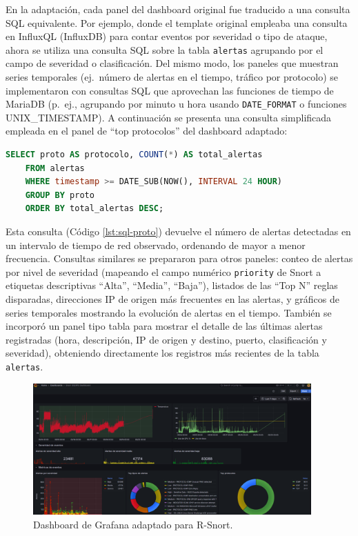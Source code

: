 \documentclass[11pt,a4paper,twoside]{report}
\begin{document}
En la adaptación, cada panel del dashboard original fue traducido a una consulta SQL equivalente. Por ejemplo, donde el template original empleaba una consulta en InfluxQL (InfluxDB) para contar eventos por severidad o tipo de ataque, ahora se utiliza una consulta SQL sobre la tabla \texttt{alertas} agrupando por el campo de severidad o clasificación. Del mismo modo, los paneles que muestran series temporales (ej.~número de alertas en el tiempo, tráfico por protocolo) se implementaron con consultas SQL que aprovechan las funciones de tiempo de MariaDB (p.~ej., agrupando por minuto u hora usando \texttt{DATE\_FORMAT} o funciones UNIX\_TIMESTAMP). A continuación se presenta una consulta simplificada empleada en el panel de “top protocolos” del dashboard adaptado:

\begin{lstlisting}[language=SQL, caption={Consulta SQL (simplificada) para panel de protocolos en Grafana}, label={lst:sql-proto}]
	SELECT proto AS protocolo, COUNT(*) AS total_alertas
	FROM alertas
	WHERE timestamp >= DATE_SUB(NOW(), INTERVAL 24 HOUR)
	GROUP BY proto
	ORDER BY total_alertas DESC;
\end{lstlisting}

Esta consulta (Código \ref{lst:sql-proto}) devuelve el número de alertas detectadas en un intervalo de tiempo de red observado, ordenando de mayor a menor frecuencia. Consultas similares se prepararon para otros paneles: conteo de alertas por nivel de severidad (mapeando el campo numérico \texttt{priority} de Snort a etiquetas descriptivas “Alta”, “Media”, “Baja”), listados de las “Top N” reglas disparadas, direcciones IP de origen más frecuentes en las alertas, y gráficos de series temporales mostrando la evolución de alertas en el tiempo. También se incorporó un panel tipo tabla para mostrar el detalle de las últimas alertas registradas (hora, descripción, IP de origen y destino, puerto, clasificación y severidad), obteniendo directamente los registros más recientes de la tabla \texttt{alertas}.

\begin{figure}[htb]
	\centering
	\includegraphics[width=0.95\textwidth]{documento/grafana1.png}
	\caption{Dashboard de Grafana adaptado para R-Snort.}
	\label{fig:grafana-dashboard}
\end{figure}
\end{document}
